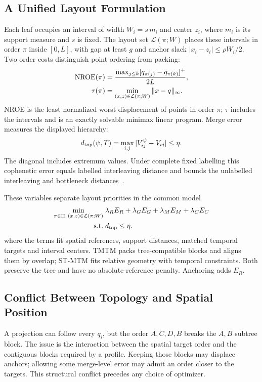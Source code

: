 \subsection{A Unified Layout Formulation}\label{sec:common}
Each leaf occupies an interval of width $W_i=s\,m_i$ and center $z_i$, where $m_i$ is its support measure and $s$ is fixed. The layout set $\mathcal{L}(\pi;W)$ places these intervals in order $\pi$ inside $[0,L]$, with gap at least $g$ and anchor slack $|x_i-z_i|\le\rho W_i/2$. Two order costs distinguish point ordering from packing:
\begin{equation}\label{eq:nroe}
\begin{aligned}
\mathrm{NROE}(\pi)&=\frac{\max_{j\le k}[q_{\pi(j)}-q_{\pi(k)}]^+}{2L},\\
\tau(\pi)&=\min_{(x,z)\in\mathcal{L}(\pi;W)}\|x-q\|_\infty .
\end{aligned}
\end{equation}
NROE is the least normalized worst displacement of points in order $\pi$; $\tau$ includes the intervals and is an exactly solvable minimax linear program. Merge error measures the displayed hierarchy:
\begin{equation}\label{eq:dtop}
d_{\mathrm{top}}(\psi,T)=\max_{i,j}|V_{ij}^{\psi}-V_{ij}|\le\eta.
\end{equation}
The diagonal includes extremum values. Under complete fixed labelling this cophenetic error equals labelled interleaving distance and bounds the unlabelled interleaving and bottleneck distances~\cite{Munch:2019:LINF,Gasparovic:2024:IID,Morozov:2013:IDMT}.

These variables separate layout priorities in the common model
\begin{equation}\label{eq:family}
\begin{aligned}
\min_{\pi\in\Pi,\,(x,z)\in\mathcal{L}(\pi;W)}\;&\lambda_RE_R+\lambda_GE_G+\lambda_ME_M+\lambda_CE_C\\
\mathrm{s.t.}\;&d_{\mathrm{top}}\le\eta.
\end{aligned}
\end{equation}
where the terms fit spatial references, support distances, matched temporal targets and interval centers. TMTM packs tree-compatible blocks and aligns them by overlap; ST-MTM fits relative geometry with temporal constraints. Both preserve the tree and have no absolute-reference penalty. Anchoring adds $E_R$. \subsection{Conflict Between Topology and Spatial Position}
A projection can follow every $q_i$, but the order $A,C,D,B$ breaks the $A,B$ subtree block. The issue is the interaction between the spatial target order and the contiguous blocks required by a profile. Keeping those blocks may displace anchors; allowing some merge-level error may admit an order closer to the targets. This structural conflict precedes any choice of optimizer.

